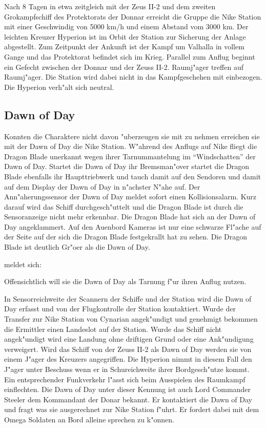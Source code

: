 
Nach 8 Tagen in etwa zeitgleich mit der Zeus II-2 und dem zweiten Gro\3kampfschiff des Protektorats der Donnar erreicht die Gruppe die Nike Station mit einer Geschwindig von 5000 km/h und einem Abstand vom 3000 km. Der leichten Kreuzer Hyperion ist im Orbit der Station zur Sicherung der Anlage abgestellt. Zum Zeitpunkt der Ankunft ist der Kampf um Valhalla in vollem Gange und das Protektorat befindet sich im Krieg. Parallel zum Anflug beginnt ein Gefecht zwischen der Donnar und der Zeuss II-2. Raumj"ager treffen auf Raumj"ager. Die Station wird dabei nicht in das Kampfgeschehen mit einbezogen. Die Hyperion verh"alt sich neutral.

\subsection{Dawn of Day}
Konnten die Charaktere \xl{} nicht davon "uberzeugen sie mit zu nehmen erreichen sie mit der Dawn of Day die Nike Station. W"ahrend des Anflugs auf Nike fliegt die Dragon Blade unerkannt wegen ihrer Tarnummantelung im "`Windschatten"' der Dawn of Day. Startet die Dawn of Day ihr Bremsman"over startet die Dragon Blade ebenfalls ihr Haupttriebwerk und tauch damit auf den Sendoren und damit auf dem Display der Dawn of Day in n"achster N"ahe auf. Der Ann"aherungssensor der Dawn of Day meldet sofort einen Kollisionsalarm. Kurz darauf wird das Schiff durchgesch"uttelt und die Dragon Blade ist durch die Sensoranzeige nicht mehr erkennbar. Die Dragon Blade hat sich an der Dawn of Day angeklammert. Auf den Au\3enbord Kameras ist nur eine schwarze Fl"ache auf der Seite auf der sich die Dragon Blade festgekrallt hat zu sehen. Die Dragon Blade ist deutlich Gr"o\3er als die Dawn of Day.

\xl{} meldet sich:


Offensichtlich will sie die Dawn of Day als Tarnung f"ur ihren Anflug nutzen.

In Sensorreichweite der  Scannern der Schiffe und der Station wird die Dawn of Day erfasst und von der Flugkontrolle der Station kontaktiert. Wurde der Transfer zur Nike Station von Cynarian angek"undigt und genehmigt bekommen die Ermittler einen Landeslot auf der Station. Wurde das Schiff nicht angek"undigt wird eine Landung ohne driftigen Grund oder eine Ank"undigung verweigert. Wird das Schiff von der Zeuss II-2 als Dawn of Day werden sie von einem J"ager des Kreuzers angegriffen. Die Hyperion nimmt in diesem Fall den J"ager unter Beschuss wenn er in Schu\3reichweite ihrer Bordgesch"utze kommt. Ein entsprechender Funkverkehr l"asst sich beim Ausspielen des Raumkampf einflechten. Die Dawn of Day unter dieser Kennung ist auch Lord Commander Steeler dem Kommandant der Donar bekannt. Er kontaktiert die Dawn of Day und fragt was sie ausgerechnet zur Nike Station f"uhrt. Er fordert dabei mit dem Omega Soldaten an Bord alleine sprechen zu k"onnen.

